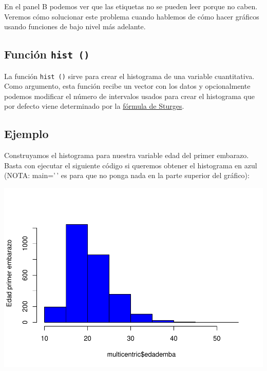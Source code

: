 \documentclass[
]{book}
\newenvironment{Shaded}{\begin{snugshade}}{\end{snugshade}}
\newcommand{\AttributeTok}[1]{\textcolor[rgb]{0.77,0.63,0.00}{#1}}
\newcommand{\FunctionTok}[1]{\textcolor[rgb]{0.00,0.00,0.00}{#1}}
\newcommand{\NormalTok}[1]{#1}
\newcommand{\SpecialCharTok}[1]{\textcolor[rgb]{0.00,0.00,0.00}{#1}}
\newcommand{\StringTok}[1]{\textcolor[rgb]{0.31,0.60,0.02}{#1}}
\begin{document}
En el panel B podemos ver que las etiquetas no se pueden leer porque no caben. Veremos cómo solucionar este problema cuando hablemos de cómo hacer gráficos usando funciones de bajo nivel más adelante.

\hypertarget{funciuxf3n-hist}{%
\subsection{\texorpdfstring{Función \texttt{hist\ ()}}{Función hist ()}}\label{funciuxf3n-hist}}

La función \texttt{hist\ ()} sirve para crear el histograma de una variable cuantitativa. Como argumento, esta función recibe un vector con los datos y opcionalmente podemos modificar el número de intervalos usados para crear el histograma que por defecto viene determinado por la \href{https://es.wikipedia.org/wiki/Regla_de_Sturges}{fórmula de Sturges}.

\hypertarget{ejemplo-7}{%
\subsection*{Ejemplo}\label{ejemplo-7}}

Construyamos el histograma para nuestra variable edad del primer embarazo. Basta con ejecutar el siguiente código si queremos obtener el histograma en azul (NOTA: main='\,' es para que no ponga nada en la parte superior del gráfico):

\begin{Shaded}
\end{Shaded}

\includegraphics{fig/unnamed-chunk-80-1.pdf}
\end{document}
